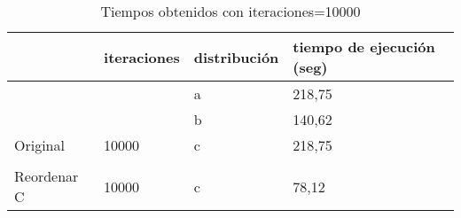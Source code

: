 \documentclass{article}
\begin{document}
	
		\begin{table}[h]
		\begin{tabular}{llll}
			\hline
			\rowcolor[HTML]{F8A102} 
			\multicolumn{1}{|l|}{\cellcolor[HTML]{F8A102}modificación} & \multicolumn{1}{l|}{\cellcolor[HTML]{F8A102}iteraciones} & \multicolumn{1}{l|}{\cellcolor[HTML]{F8A102}distribución} & \multicolumn{1}{l|}{\cellcolor[HTML]{F8A102}tiempo de ejecución (seg)} \\ \hline
			\multicolumn{1}{|l|}{}                                     & \multicolumn{1}{l|}{}                                    & \multicolumn{1}{l|}{a}                                    & \multicolumn{1}{l|}{218,75}                                      \\ \cline{3-4} 
			\multicolumn{1}{|l|}{}                                     & \multicolumn{1}{l|}{}                                    & \multicolumn{1}{l|}{b}                                    & \multicolumn{1}{l|}{140,62}                                      \\ \cline{3-4} 
			\multicolumn{1}{|l|}{\multirow{-3}{*}{Original}}           & \multicolumn{1}{l|}{\multirow{-3}{*}{10000}}             & \multicolumn{1}{l|}{c}                                    & \multicolumn{1}{l|}{218,75}                                      \\ \hline
			&                                                          &                                                           &                                                                  \\ \hline
			\multicolumn{1}{|l|}{Reordenar C}                          & \multicolumn{1}{l|}{10000}                               & \multicolumn{1}{l|}{c}                                    & \multicolumn{1}{l|}{78,12}                                       \\ \hline
		\end{tabular}
		\caption{Tiempos obtenidos con iteraciones=10000}
	\end{table}

	\newpage
\end{document}
